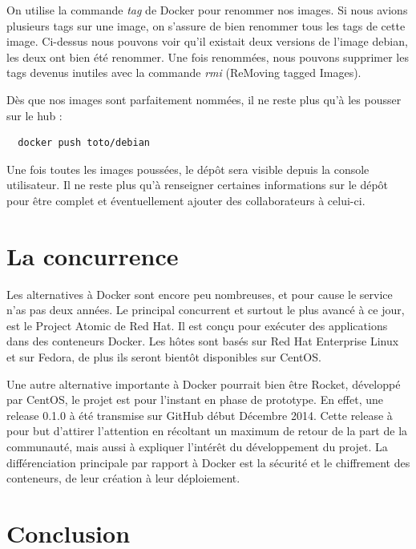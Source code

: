 \documentclass[12pt,a4paper]{article}
\begin{document}
On utilise la commande \textit{tag} de Docker pour renommer nos images. Si nous avions plusieurs tags sur une image, on s'assure de bien renommer tous les tags de cette image. Ci-dessus nous pouvons voir qu'il existait deux versions de l'image debian, les deux ont bien été renommer. Une fois renommées, nous pouvons supprimer les tags devenus inutiles avec la commande \textit{rmi} (ReMoving tagged Images).

Dès que nos images sont parfaitement nommées, il ne reste plus qu'à les pousser sur le hub :

\begin{lstlisting}
  docker push toto/debian
\end{lstlisting}

Une fois toutes les images poussées, le dépôt sera visible depuis la console utilisateur. Il ne reste plus qu'à renseigner certaines informations sur le dépôt pour être complet et éventuellement ajouter des collaborateurs à celui-ci. 

\section{La concurrence}

Les alternatives à Docker sont encore peu nombreuses, et pour cause le service n'as pas deux années. Le principal concurrent et surtout le plus avancé à ce jour, est le Project Atomic de Red Hat. Il est conçu pour exécuter des applications dans des conteneurs Docker. Les hôtes sont basés sur Red Hat Enterprise Linux et sur Fedora, de plus ils seront bientôt disponibles sur CentOS.

Une autre alternative importante à Docker pourrait bien être Rocket, développé par CentOS, le projet est pour l'instant en phase de prototype. En effet, une release 0.1.0 à été transmise sur GitHub début Décembre 2014. Cette release à pour but d'attirer l'attention en récoltant un maximum de retour de la part de la communauté, mais aussi à expliquer l'intérêt du développement du projet. La différenciation principale par rapport à Docker est la sécurité et le chiffrement des conteneurs, de leur création à leur déploiement.

\section{Conclusion}
\end{document}
